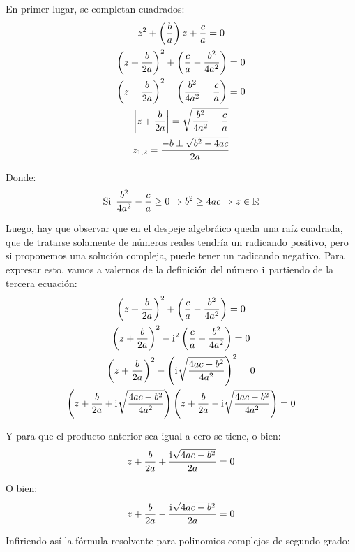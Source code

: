 \documentclass[a5paper,12pt,twoside]{book}
\begin{document}
En primer lugar, se completan cuadrados:
\begin{gather*}
    z^2 + \left(\frac{b}{a} \right) z + \frac{c}{a} = 0
    \\
    \left( z+\frac{b}{2a} \right)^2 + \left( \frac{c}{a}-\frac{b^2}{4a^2} \right) = 0
    \\
    \left( z+\frac{b}{2a} \right)^2 - \left( \frac{b^2}{4a^2} - \frac{c}{a} \right) = 0
    \\
    {\left| {z+\frac{b}{2a}} \right|} = \sqrt{\frac{b^2}{4a^2} - \frac{c}{a}}
    \\
    z_{1,2} = \frac{-b \pm \sqrt{b^2-4ac}}{2a}
\end{gather*}

Donde:
\begin{equation*}
    \textrm{Si} \enspace \frac{b^2}{4a^2} - \frac{c}{a} \geq 0 \Rightarrow b^2 \geq 4ac \Rightarrow z \in \mathbb{R}
\end{equation*}

Luego, hay que observar que en el despeje algebráico queda una raíz cuadrada, que de tratarse solamente de números reales tendría un radicando positivo, pero si proponemos una solución compleja, puede tener un radicando negativo. Para expresar esto, vamos a valernos de la definición del número $\mathrm{i}\mkern1mu$ partiendo de la tercera ecuación:
\begin{gather*}
    \left( z+\frac{b}{2a} \right)^2 + \left( \frac{c}{a} - \frac{b^2}{4a^2} \right) = 0
    \\
    \left( z+\frac{b}{2a} \right)^2 - \iu^2 \left( \frac{c}{a}-\frac{b^2}{4a^2} \right) = 0
    \\
    \left( z+\frac{b}{2a} \right)^2 - \left( \iu \sqrt{\frac{4ac-b^2}{4a^2}} \right)^2 = 0
    \\
    \scale{0.98}
    {
    \left( z+\frac{b}{2a} + \iu \sqrt{\frac{4ac-b^2}{4a^2}} \right) \left( z+\frac{b}{2a} - \iu \sqrt{\frac{4ac-b^2}{4a^2}} \right) = 0
    }
\end{gather*}

Y para que el producto anterior sea igual a cero se tiene, o bien:
\begin{equation*}
    z + \frac{b}{2a} + \frac{\mathrm{i}\mkern1mu \sqrt{4ac-b^2}}{2a} = 0
\end{equation*}

O bien:
\begin{equation*}
    z + \frac{b}{2a} - \frac{\mathrm{i}\mkern1mu \sqrt{4ac-b^2}}{2a} = 0
\end{equation*}

Infiriendo así la fórmula resolvente para polinomios complejos de segundo grado:
\end{document}
